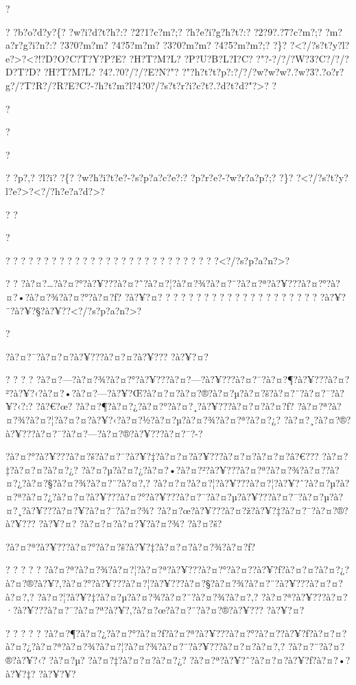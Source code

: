 \documentclass[11pt, openany]{book}
\begin{document}
{{{{{{{{{{{{{{{?

? ?b?o?d?y?\{? ?w?i?d?t?h?:? ?2?1?c?m?;? ?h?e?i?g?h?t?:? ?2?9?.?7?c?m?;?
?m?a?r?g?i?n?:? ?3?0?m?m? ?4?5?m?m? ?3?0?m?m? ?4?5?m?m?;? ?\}?
?\textless{}?/?s?t?y?l?e?\textgreater{}?\textless{}?!?D?O?C?T?Y?P?E?
?H?T?M?L? ?P?U?B?L?I?C? ?"?-?/?/?W?3?C?/?/?D?T?D? ?H?T?M?L?
?4?.?0?/?/?E?N?"?
?"?h?t?t?p?:?/?/?w?w?w?.?w?3?.?o?r?g?/?T?R?/?R?E?C?-?h?t?m?l?4?0?/?s?t?r?i?c?t?.?d?t?d?"?\textgreater{}?
?

?

?

?

? ?p?,? ?l?i? ?\{? ?w?h?i?t?e?-?s?p?a?c?e?:? ?p?r?e?-?w?r?a?p?;? ?\}?
?\textless{}?/?s?t?y?l?e?\textgreater{}?\textless{}?/?h?e?a?d?\textgreater{}?

? ?

?

? ? ? ? ? ? ? ? ? ? ? ? ? ? ? ? ? ? ? ? ? ? ? ? ? ? ?
?\textless{}?/?s?p?a?n?\textgreater{}?

? ?
?à?¤?\ldots{}?à?¤?°?à?¥???à?¤?˜?à?¤?¦?à?¤?¾?à?¤?¨?à?¤?ª?à?¥???à?¤?°?à?¤?•?à?¤?¾?à?¤?°?à?¤?ƒ?
?à?¥?¤? ? ? ? ? ? ? ? ? ? ? ? ? ? ? ? ? ? ? ? ?
?à?¥?¨?à?¥?§?à?¥?­?\textless{}?/?s?p?a?n?\textgreater{}?

?

?à?¤?¯?à?¤?¤?à?¥???à?¤?¤?à?¥??? ?à?¥?¤?

? ? ? ?
?à?¤?---?à?¤?¾?à?¤?°?à?¥???à?¤?---?à?¥???à?¤?¯?à?¤?¶?à?¥???à?¤?²?à?¥?‹?à?¤?•?à?¤?---?à?¥?Œ?à?¤?¤?à?¤?®?à?¤?µ?à?¤?š?à?¤?¨?à?¤?¯?à?¥?‹?:?
?â?€?œ? ?à?¤?¶?à?¤?¿?à?¤?°?à?¤?¸?à?¥???à?¤?¤?à?¤?ƒ?
?à?¤?ª?à?¤?¾?à?¤?¦?à?¤?¤?à?¥?‹?à?¤?½?à?¤?µ?à?¤?¾?à?¤?ª?à?¤?¿?
?à?¤?¸?à?¤?®?à?¥???à?¤?¯?à?¤?---?à?¤?®?à?¥???à?¤?¯?-?

?à?¤?°?à?¥???à?¤?š?à?¤?¯?à?¥?‡?à?¤?¤?à?¥???à?¤?¤?à?¤?¤?â?€???
?à?¤?‡?à?¤?¤?à?¤?¿?
?à?¤?µ?à?¤?¿?à?¤?•?à?¤?²?à?¥???à?¤?ª?à?¤?¾?à?¤?­?à?¤?¿?à?¤?§?à?¤?¾?à?¤?¨?à?¤?‚?
?à?¤?¤?à?¤?¦?à?¥???à?¤?¦?à?¥?ˆ?à?¤?µ?à?¤?ª?à?¤?¿?à?¤?¤?à?¥???à?¤?°?à?¥???à?¤?¯?à?¤?µ?à?¥???à?¤?¯?à?¤?µ?à?¤?¸?à?¥???à?¤?¥?à?¤?¯?à?¤?¾?
?à?¤?œ?à?¥???à?¤?ž?à?¥?‡?à?¤?¯?à?¤?®?à?¥??? ?à?¥?¤? ?à?¤?¤?à?¤?¥?à?¤?¾?
?à?¤?š?

?à?¤?ª?à?¥???à?¤?°?à?¤?š?à?¥?‡?à?¤?¤?à?¤?¾?à?¤?ƒ?

? ? ? ? ?
?à?¤?ª?à?¤?¾?à?¤?¦?à?¤?ª?à?¥???à?¤?°?à?¤?­?à?¥?ƒ?à?¤?¤?à?¤?¿?à?¤?®?à?¥?‚?à?¤?°?à?¥???à?¤?¦?à?¥???à?¤?§?à?¤?¾?à?¤?¨?à?¥???à?¤?¤?à?¤?‚?
?à?¤?¦?à?¥?‡?à?¤?µ?à?¤?¾?à?¤?¨?à?¤?¾?à?¤?‚?
?à?¤?ª?à?¥???à?¤?·?à?¥???à?¤?¯?à?¤?ª?à?¥?‚?à?¤?œ?à?¤?¨?à?¤?®?à?¥???
?à?¥?¤?

? ? ? ? ?
?à?¤?¶?à?¤?¿?à?¤?°?à?¤?ƒ?à?¤?ª?à?¥???à?¤?°?à?¤?­?à?¥?ƒ?à?¤?¤?à?¤?¿?à?¤?ª?à?¤?¾?à?¤?¦?à?¤?¾?à?¤?¨?à?¥???à?¤?¤?à?¤?‚?
?à?¤?¨?à?¤?®?à?¥?‹? ?à?¤?µ? ?à?¤?‡?à?¤?¤?à?¤?¿?
?à?¤?ª?à?¥?ˆ?à?¤?¤?à?¥?ƒ?à?¤?•?à?¥?‡? ?à?¥?¥?

}}}}}}}}}}}}}}}
\end{document}
